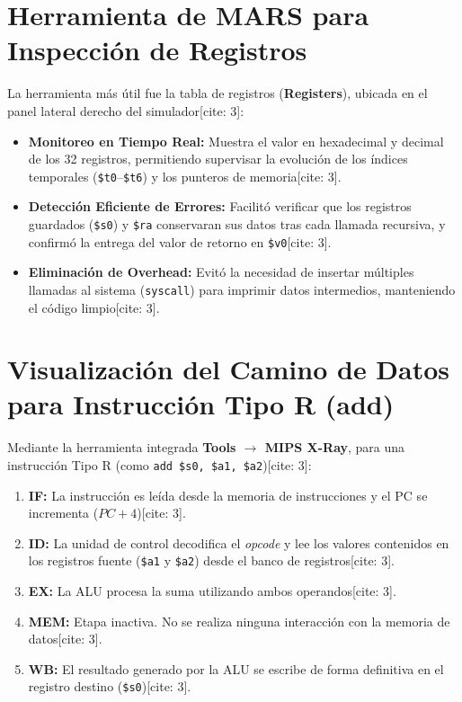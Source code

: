 \documentclass[12pt,a4paper]{article}
\begin{document}
\section{Herramienta de MARS para Inspección de Registros}

La herramienta más útil fue la tabla de registros (\textbf{Registers}), ubicada en el panel lateral derecho del simulador[cite: 3]:

\begin{itemize}
    \item \textbf{Monitoreo en Tiempo Real:} Muestra el valor en hexadecimal y decimal de los 32 registros, permitiendo supervisar la evolución de los índices temporales (\texttt{\$t0}--\texttt{\$t6}) y los punteros de memoria[cite: 3].
    \item \textbf{Detección Eficiente de Errores:} Facilitó verificar que los registros guardados (\texttt{\$s0}) y \texttt{\$ra} conservaran sus datos tras cada llamada recursiva, y confirmó la entrega del valor de retorno en \texttt{\$v0}[cite: 3].
    \item \textbf{Eliminación de Overhead:} Evitó la necesidad de insertar múltiples llamadas al sistema (\texttt{syscall}) para imprimir datos intermedios, manteniendo el código limpio[cite: 3].
\end{itemize}


\section{Visualización del Camino de Datos para Instrucción Tipo R (add)}

Mediante la herramienta integrada \textbf{Tools $\rightarrow$ MIPS X-Ray}, para una instrucción Tipo R (como \texttt{add \$s0, \$a1, \$a2})[cite: 3]:
\begin{enumerate}
    \item \textbf{IF:} La instrucción es leída desde la memoria de instrucciones y el PC se incrementa ($PC + 4$)[cite: 3].
    \item \textbf{ID:} La unidad de control decodifica el \textit{opcode} y lee los valores contenidos en los registros fuente (\texttt{\$a1} y \texttt{\$a2}) desde el banco de registros[cite: 3].
    \item \textbf{EX:} La ALU procesa la suma utilizando ambos operandos[cite: 3].
    \item \textbf{MEM:} Etapa inactiva. No se realiza ninguna interacción con la memoria de datos[cite: 3].
    \item \textbf{WB:} El resultado generado por la ALU se escribe de forma definitiva en el registro destino (\texttt{\$s0})[cite: 3].
\end{enumerate}
\end{document}
